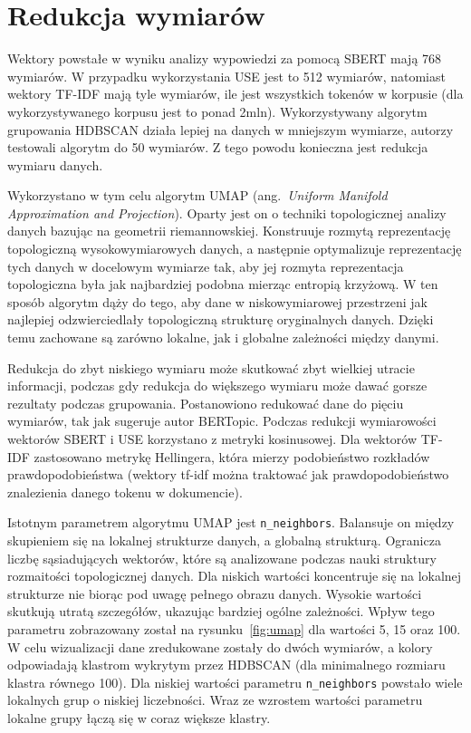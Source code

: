 \section{Redukcja wymiarów}
	Wektory powstałe w wyniku analizy wypowiedzi za pomocą SBERT mają 768 wymiarów.
	W przypadku wykorzystania USE jest to 512 wymiarów, natomiast wektory TF-IDF mają tyle wymiarów,
		ile jest wszystkich tokenów w korpusie (dla wykorzystywanego korpusu jest to ponad 2mln).
	Wykorzystywany algorytm grupowania HDBSCAN działa lepiej na danych w mniejszym wymiarze,
		autorzy testowali algorytm do 50 wymiarów\cite{HDBSCAN}.
	Z tego powodu konieczna jest redukcja wymiaru danych.
	
	Wykorzystano w tym celu algorytm UMAP (ang.\ \emph{Uniform Manifold Approximation and Projection})\cite{UMAP}.
	Oparty jest on o techniki topologicznej analizy danych bazując na geometrii riemannowskiej.
	Konstruuje rozmytą reprezentację topologiczną wysokowymiarowych danych,
		a następnie optymalizuje reprezentację tych danych w docelowym wymiarze tak,
		aby jej rozmyta reprezentacja topologiczna była jak najbardziej podobna mierząc entropią krzyżową.
	W ten sposób algorytm dąży do tego, aby dane w niskowymiarowej przestrzeni jak najlepiej odzwierciedlały topologiczną strukturę oryginalnych danych.
	Dzięki temu zachowane są zarówno lokalne, jak i globalne zależności między danymi.

	Redukcja do zbyt niskiego wymiaru może skutkować zbyt wielkiej utracie informacji,
		podczas gdy redukcja do większego wymiaru może dawać gorsze rezultaty podczas grupowania.
	Postanowiono redukować dane do pięciu wymiarów, tak jak sugeruje autor BERTopic\cite{BERTopic}.
	Podczas redukcji wymiarowości wektorów SBERT i USE korzystano z metryki kosinusowej.
	Dla wektorów TF-IDF zastosowano metrykę Hellingera, która mierzy podobieństwo rozkładów prawdopodobieństwa
		(wektory tf-idf można traktować jak prawdopodobieństwo znalezienia danego tokenu w dokumencie).
	
	Istotnym parametrem algorytmu UMAP jest \verb|n_neighbors|.
	Balansuje on między skupieniem się na lokalnej strukturze danych, a globalną strukturą.
	Ogranicza liczbę sąsiadujących wektorów, które są analizowane podczas nauki struktury rozmaitości topologicznej danych.
	Dla niskich wartości koncentruje się na lokalnej strukturze nie biorąc pod uwagę pełnego obrazu danych.
	Wysokie wartości skutkują utratą szczegółów, ukazując bardziej ogólne zależności.
	Wpływ tego parametru zobrazowany został na rysunku~\ref{fig:umap} dla wartości 5, 15 oraz 100.
	W celu wizualizacji dane zredukowane zostały do dwóch wymiarów,
		a kolory odpowiadają klastrom wykrytym przez HDBSCAN (dla minimalnego rozmiaru klastra równego 100).
	Dla niskiej wartości parametru \verb|n_neighbors| powstało wiele lokalnych grup o niskiej liczebności.
	Wraz ze wzrostem wartości parametru lokalne grupy łączą się w coraz większe klastry.

